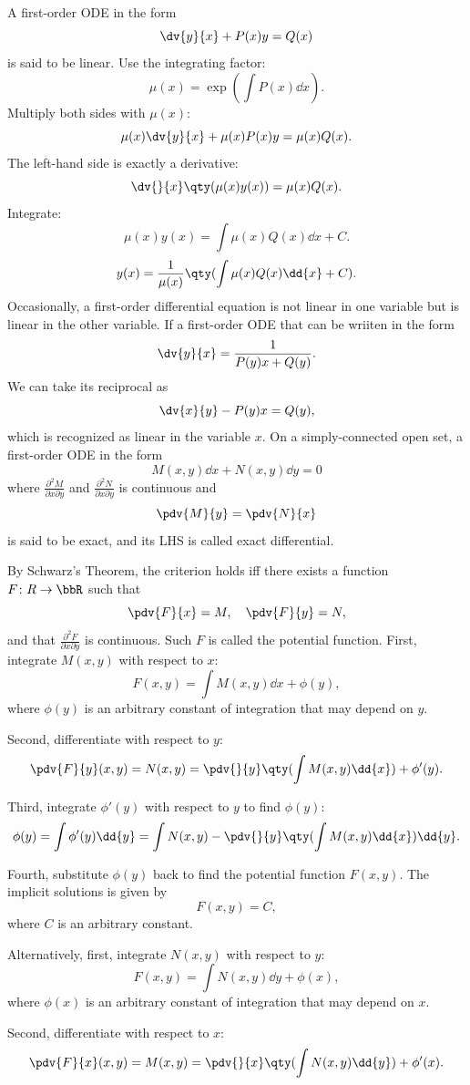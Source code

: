 \documentclass[a4paper,12pt]{report}
\begin{document}
A first-order ODE in the form
\[\dv{y}{x}+P(x)y=Q(x)\]
is said to be linear.
Use the integrating factor:
\[\mu(x)=\exp(\int P(x)\dd{x}).\]
Multiply both sides with $\mu(x)$:
\[\mu(x)\dv{y}{x}+\mu(x)P(x)y=\mu(x)Q(x).\]
The left-hand side is exactly a derivative:
\[\dv{}{x}\qty(\mu(x)y(x))=\mu(x)Q(x).\]
Integrate:
\[\mu(x)y(x)=\int\mu(x)Q(x)\dd{x}+C.\]
\[y(x)=\frac{1}{\mu(x)}\qty(\int\mu(x)Q(x)\dd{x}+C).\]
Occasionally, a first-order differential equation is not linear in one variable but is linear in the other variable. If a first-order ODE that can be wriiten in the form
\[\dv{y}{x}=\frac{1}{P(y)x+Q(y)}.\]
We can take its reciprocal as
\[\dv{x}{y}-P(y)x=Q(y),\]
which is recognized as linear in the variable $x$.
On a simply-connected open set, a first-order ODE in the form
\[M(x,y)\dd{x}+N(x,y)\dd{y}=0\]
where $\frac{\partial^2M}{\partial x\partial y}$ and $\frac{\partial^2N}{\partial x\partial y}$ is continuous and
\[\pdv{M}{y}=\pdv{N}{x}\]
is said to be exact, and its LHS is called exact differential.

By Schwarz's Theorem, the criterion holds iff there exists a function $F\colon R\to\bbR$ such that
\[\pdv{F}{x}=M,\quad\pdv{F}{y}=N,\]
and that $\frac{\partial^2F}{\partial x\partial y}$ is continuous. Such $F$ is called the potential function.
First, integrate $M(x,y)$ with respect to $x$:
\[F(x,y)=\int M(x,y)\dd{x}+\phi(y),\]
where $\phi(y)$ is an arbitrary constant of integration that may depend on $y$.

Second, differentiate with respect to $y$:
\[\pdv{F}{y}(x,y)=N(x,y)=\pdv{}{y}\qty(\int M(x,y)\dd{x})+\phi'(y).\]

Third, integrate $\phi'(y)$ with respect to $y$ to find $\phi(y)$:
\[\phi(y)=\int\phi'(y)\dd{y}=\int N(x,y)-\pdv{}{y}\qty(\int M(x,y)\dd{x})\dd{y}.\]

Fourth, substitute $\phi(y)$ back to find the potential function $F(x,y)$. The implicit solutions is given by
\[F(x,y)=C,\]
where $C$ is an arbitrary constant.

Alternatively, first, integrate $N(x,y)$ with respect to $y$:
\[F(x,y)=\int N(x,y)\dd{y}+\phi(x),\]
where $\phi(x)$ is an arbitrary constant of integration that may depend on $x$.

Second, differentiate with respect to $x$:
\[\pdv{F}{x}(x,y)=M(x,y)=\pdv{}{x}\qty(\int N(x,y)\dd{y})+\phi'(x).\]
\end{document}

